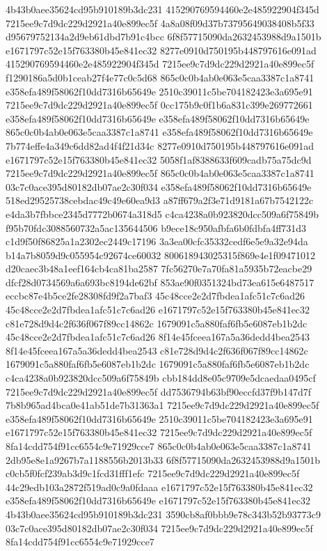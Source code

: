 4b43b0aee35624cd95b910189b3dc231
415290769594460e2e485922904f345d
7215ee9c7d9dc229d2921a40e899ec5f
4a8a08f09d37b73795649038408b5f33
d95679752134a2d9eb61dbd7b91c4bcc
6f8f57715090da2632453988d9a1501b
e1671797c52e15f763380b45e841ec32
8277e0910d750195b448797616e091ad
415290769594460e2e485922904f345d
7215ee9c7d9dc229d2921a40e899ec5f
f1290186a5d0b1ceab27f4e77c0c5d68
865c0c0b4ab0e063e5caa3387c1a8741
e358efa489f58062f10dd7316b65649e
2510c39011c5be704182423e3a695e91
7215ee9c7d9dc229d2921a40e899ec5f
0cc175b9c0f1b6a831c399e269772661
e358efa489f58062f10dd7316b65649e
e358efa489f58062f10dd7316b65649e
865c0c0b4ab0e063e5caa3387c1a8741
e358efa489f58062f10dd7316b65649e
7b774effe4a349c6dd82ad4f4f21d34c
8277e0910d750195b448797616e091ad
e1671797c52e15f763380b45e841ec32
5058f1af8388633f609cadb75a75dc9d
7215ee9c7d9dc229d2921a40e899ec5f
865c0c0b4ab0e063e5caa3387c1a8741
03c7c0ace395d80182db07ae2c30f034
e358efa489f58062f10dd7316b65649e
518ed29525738cebdac49c49e60ea9d3
a87ff679a2f3e71d9181a67b7542122c
e4da3b7fbbce2345d7772b0674a318d5
c4ca4238a0b923820dcc509a6f75849b
f95b70fdc3088560732a5ac135644506
b9ece18c950afbfa6b0fdbfa4ff731d3
c1d9f50f86825a1a2302ec2449c17196
3a3ea00cfc35332cedf6e5e9a32e94da
b14a7b8059d9c055954c92674ce60032
800618943025315f869e4e1f09471012
d20caec3b48a1eef164cb4ca81ba2587
7fc56270e7a70fa81a5935b72eacbe29
dfcf28d0734569a6a693bc8194de62bf
853ae90f0351324bd73ea615e6487517
eccbc87e4b5ce2fe28308fd9f2a7baf3
45c48cce2e2d7fbdea1afc51c7c6ad26
45c48cce2e2d7fbdea1afc51c7c6ad26
e1671797c52e15f763380b45e841ec32
c81e728d9d4c2f636f067f89cc14862c
1679091c5a880faf6fb5e6087eb1b2dc
45c48cce2e2d7fbdea1afc51c7c6ad26
8f14e45fceea167a5a36dedd4bea2543
8f14e45fceea167a5a36dedd4bea2543
c81e728d9d4c2f636f067f89cc14862c
1679091c5a880faf6fb5e6087eb1b2dc
1679091c5a880faf6fb5e6087eb1b2dc
c4ca4238a0b923820dcc509a6f75849b
cbb184dd8e05c9709e5dcaedaa0495cf
7215ee9c7d9dc229d2921a40e899ec5f
dd7536794b63bf90eccfd37f9b147d7f
7b8b965ad4bca0e41ab51de7b31363a1
7215ee9c7d9dc229d2921a40e899ec5f
e358efa489f58062f10dd7316b65649e
2510c39011c5be704182423e3a695e91
e1671797c52e15f763380b45e841ec32
7215ee9c7d9dc229d2921a40e899ec5f
8fa14cdd754f91cc6554c9e71929cce7
865c0c0b4ab0e063e5caa3387c1a8741
2db95e8e1a9267b7a1188556b2013b33
6f8f57715090da2632453988d9a1501b
c0cb5f0fcf239ab3d9c1fcd31fff1efc
7215ee9c7d9dc229d2921a40e899ec5f
44c29edb103a2872f519ad0c9a0fdaaa
e1671797c52e15f763380b45e841ec32
e358efa489f58062f10dd7316b65649e
e1671797c52e15f763380b45e841ec32
4b43b0aee35624cd95b910189b3dc231
3590cb8af0bbb9e78c343b52b93773c9
03c7c0ace395d80182db07ae2c30f034
7215ee9c7d9dc229d2921a40e899ec5f
8fa14cdd754f91cc6554c9e71929cce7

